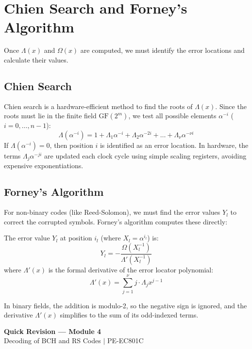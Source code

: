 \documentclass[12pt,a4paper]{article}
\begin{document}
\section{Chien Search and Forney's Algorithm}

Once $\Lambda(x)$ and $\Omega(x)$ are computed, we must identify the error locations and calculate their values.

\subsection{Chien Search}
Chien search is a hardware-efficient method to find the roots of $\Lambda(x)$. Since the roots must lie in the finite field $\text{GF}(2^m)$, we test all possible elements $\alpha^{-i}$ ($i = 0, \dots, n-1$):
\[ \Lambda(\alpha^{-i}) = 1 + \Lambda_1 \alpha^{-i} + \Lambda_2 \alpha^{-2i} + \dots + \Lambda_\nu \alpha^{-\nu i} \]
If $\Lambda(\alpha^{-i}) = 0$, then position $i$ is identified as an error location.
In hardware, the terms $\Lambda_j \alpha^{-ji}$ are updated each clock cycle using simple scaling registers, avoiding expensive exponentiations.

\subsection{Forney's Algorithm}
For non-binary codes (like Reed-Solomon), we must find the error values $Y_l$ to correct the corrupted symbols. Forney's algorithm computes these directly:
\begin{tcolorbox}[formulabox, title={\textbf{Forney's Error Value Formula}}]
The error value $Y_l$ at position $i_l$ (where $X_l = \alpha^{i_l}$) is:
\[ Y_l = - \frac{\Omega(X_l^{-1})}{\Lambda'(X_l^{-1})} \]
where $\Lambda'(x)$ is the formal derivative of the error locator polynomial:
\[ \Lambda'(x) = \sum_{j=1}^\nu j \cdot \Lambda_j x^{j-1} \]
\end{tcolorbox}
In binary fields, the addition is modulo-2, so the negative sign is ignored, and the derivative $\Lambda'(x)$ simplifies to the sum of its odd-indexed terms.

\newpage
\begin{center}
  {\large\bfseries\color{myred} Quick Revision --- Module 4}\\[3pt]
  {\small\color{mydark} Decoding of BCH and RS Codes $|$ PE-EC801C}
\end{center}
\noindent{\color{myred}\rule{\linewidth}{1.2pt}}
\vspace{4pt}
\end{document}
